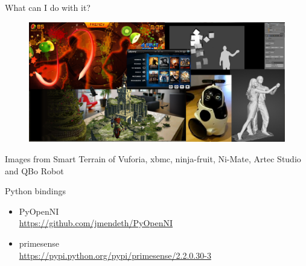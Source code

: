 \documentclass[bigger]{beamer}
\begin{document}
\begin{frame}{ What can I do with it?}

\begin{figure}[h]
		\includegraphics[scale = 0.22]{Imagenes/what_2.png}
\end{figure}
\tiny{Images from Smart Terrain \texttrademark of Vuforia\texttrademark, xbmc, ninja-fruit, Ni-Mate, Artec Studio\\ and QBo Robot}
\end{frame}

\begin{frame}[fragile]{ Python bindings}
\begin{itemize}
	\item PyOpenNI\\
    \url{https://github.com/jmendeth/PyOpenNI}
	\item primesense \\ 
    \url{https://pypi.python.org/pypi/primesense/2.2.0.30-3}
\end{itemize}

\end{frame}
\end{document}

